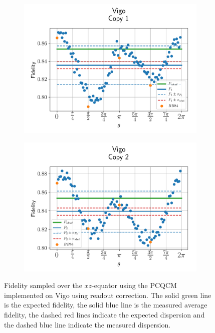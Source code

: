 \begin{figure}[H]
  \centering
  \begin{subfigure}{.5\textwidth}
    \centering
    \includegraphics[width=\textwidth]{Figures/PhaseCovariant/IBM/OnlyEquator/results_corrected_vigo_copy1.png}
    \label{fig:pc_corrected_vigo_equator_1}
  \end{subfigure}%
  \begin{subfigure}{.5\textwidth}
    \centering
    \includegraphics[width=\textwidth]{Figures/PhaseCovariant/IBM/OnlyEquator/results_corrected_vigo_copy2.png}
    \label{fig:pc_corrected_vigo_equator_2}
  \end{subfigure}
  \vspace{-0.5cm}
  \caption{Fidelity sampled over the $xz$-equator using the PCQCM implemented on Vigo using readout correction. The solid green line is the expected fidelity, the solid blue line is the measured average fidelity, the dashed red lines indicate the expected dispersion and the dashed blue line indicate the measured dispersion.}
  \label{fig:pc_corrected_vigo_equator}
\end{figure}


